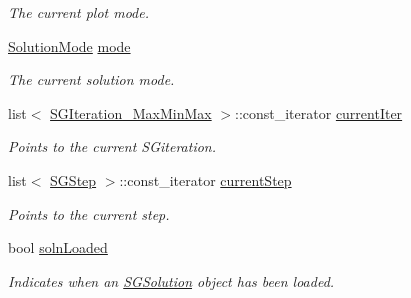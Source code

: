 \begin{DoxyCompactItemize}
\begin{DoxyCompactList}\small\item\em The current plot mode. \end{DoxyCompactList}\item 
\mbox{\label{classSGPlotController__V2_adec72c6566ac2a4c9f835eba335e7e1e}} 
\hyperlink{classSGPlotController__V2_a1a1b0d79a2202a7a5c7dd24ac8885677}{Solution\+Mode} \hyperlink{classSGPlotController__V2_adec72c6566ac2a4c9f835eba335e7e1e}{mode}
\begin{DoxyCompactList}\small\item\em The current solution mode. \end{DoxyCompactList}\item 
\mbox{\label{classSGPlotController__V2_aa3d1690cc3eb01228cf39fd93b5e3e46}} 
list$<$ \hyperlink{classSGIteration__MaxMinMax}{S\+G\+Iteration\+\_\+\+Max\+Min\+Max} $>$\+::const\+\_\+iterator \hyperlink{classSGPlotController__V2_aa3d1690cc3eb01228cf39fd93b5e3e46}{current\+Iter}
\begin{DoxyCompactList}\small\item\em Points to the current S\+Giteration. \end{DoxyCompactList}\item 
\mbox{\label{classSGPlotController__V2_ab87e91d2733ac88e959f13fd1ac0946c}} 
list$<$ \hyperlink{classSGStep}{S\+G\+Step} $>$\+::const\+\_\+iterator \hyperlink{classSGPlotController__V2_ab87e91d2733ac88e959f13fd1ac0946c}{current\+Step}
\begin{DoxyCompactList}\small\item\em Points to the current step. \end{DoxyCompactList}\item 
\mbox{\label{classSGPlotController__V2_a1fec55c0716d14459c64ef237c750253}} 
bool \hyperlink{classSGPlotController__V2_a1fec55c0716d14459c64ef237c750253}{soln\+Loaded}
\begin{DoxyCompactList}\small\item\em Indicates when an \hyperlink{classSGSolution}{S\+G\+Solution} object has been loaded. \end{DoxyCompactList}\item 
\mbox{\label{classSGPlotController__V2_ae574a3482d0384a05cf01437f9a53d72}} 

\end{DoxyCompactItemize}
